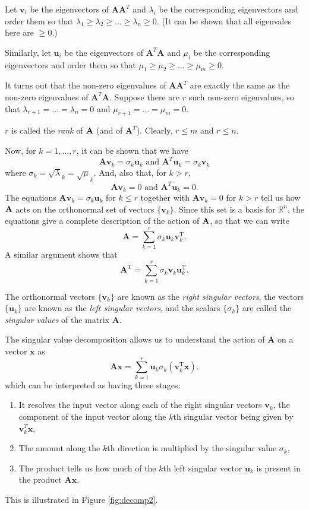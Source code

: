 Let $\mathbf v_i$ be the eigenvectors of $\mathbf {AA}^T$ and $\lambda_i$ be the corresponding eigenvectors and order them so that $\lambda_1 \geq \lambda_2 \geq \ldots \geq \lambda_n \geq 0$. (It can be shown that all eigenvales here are $\geq 0$.)

Similarly, let $\mathbf u_i$ be the eigenvectors of $\mathbf A^T\mathbf A$ and $\mu_i$ be the corresponding eigenvectors and order them so that $\mu_1 \geq \mu_2 \geq \ldots \geq \mu_m \geq 0$.

It turns out that the non-zero eigenvalues of $\mathbf{AA}^T$ are exactly the same as the non-zero eigenvalues of $\mathbf A^T\mathbf A$.  Suppose there are $r$ such non-zero eigenvalues, so that $\lambda_{r+1} = \ldots = \lambda_n = 0$ and $\mu_{r+1} = \ldots = \mu_m = 0$.

$r$ is called the {\em rank} of $\bf A$ (and of $\mathbf A^T$). Clearly, $r \leq m$ and $r \leq n$.

Now, for $k = 1,\ldots, r$, it can be shown that we have 
\[
\mathbf {Av}_k = \sigma_k \mathbf u_k \mbox{ and } \mathbf A^T \mathbf u_k = \sigma_k \mathbf v_k
\]
where $\sigma_k = \sqrt \lambda_k = \sqrt \mu_k$.  And, also that, for $k > r$,
\[
\mathbf {Av}_k = 0 \mbox{ and } \mathbf A^T \mathbf u_k =0.
\]
The equations $\mathbf {Av}_k = \sigma_k \mathbf u_k$ for  $k \leq r$ together with $\mathbf {Av}_k = 0$ for $k >r$ tell us how $\bf A$ acts on the orthonormal set of vectors $\{ \mathbf v_k \}$.  Since this set is  a basis for $\mathbb R^n$, the equations give a complete description of the action of $\bf A$, so that we can write 
\begin{equation} \mathbf A = \sum_{k = 1}^r \sigma_k \mathbf u_k \mathbf v_k ^{\mathrm T}. \label{eqn:svd2}
\end{equation}
A similar argument shows that 
\[ \mathbf A ^{\mathrm T}= \sum_{k = 1}^r \sigma_k \mathbf v_k \mathbf u_k ^{\mathrm T}. \]

The orthonormal vectors $\{ \mathbf v_k \}$ are known as the {\em right singular vectors}, the vectors $\{ \mathbf u_k \}$ are known as the {\em left singular vectors}, and the scalars $\{ \sigma_k \}$ are called the {\em singular values} of the matrix $\mathbf A$.

The singular value decomposition allows us to understand the action of $\mathbf A$ on a vector $\mathbf x$ as 
\[ \mathbf {Ax} = \sum_{k = 1}^r \mathbf u_k \sigma_k ( \mathbf v_k ^{\mathrm T} \mathbf x). 
\]
 which can be interpreted as having  three stages:
\begin{enumerate}
\item It resolves the input vector along each of the right singular vectors $\mathbf v_k$, the component of the input
vector along the $k$th singular vector being given by $\mathbf v_k^T \mathbf x$,
\item The amount along the $k$th direction is multiplied by the singular value $\sigma_k$,
\item The product tells us how much of the $k$th left singular vector $\mathbf u_k$ is present in the product $\mathbf {Ax}$.
\end{enumerate}
This is illustrated in Figure \ref{fig:decomp2}.



